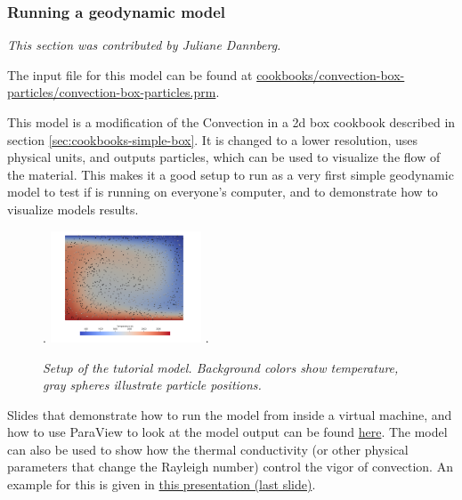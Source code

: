\subsubsection{Running a geodynamic model}
\label{sec:cookbooks-running-a-model}
\textit{This section was contributed by Juliane Dannberg.}

The input file for this model can be found at \url{cookbooks/convection-box-particles/convection-box-particles.prm}.

This model is a modification of the Convection in a 2d box cookbook described in section \ref{sec:cookbooks-simple-box}. 
It is changed to a lower resolution, uses physical units, and outputs particles, which can be used to visualize the flow 
of the material. 
This makes it a good setup to run as a very first simple geodynamic model to test if \aspect{} is running on everyone's
computer, and to demonstrate how to visualize models results. 

\begin{figure}[h]
\phantom.
\hfill
\includegraphics[width=0.4\textwidth]{cookbooks/convection-box-particles/doc/convection-box.png}
\hfill
\phantom.
\caption{\it Setup of the tutorial model. Background colors show temperature, gray spheres illustrate particle positions.}
\label{fig:convection-box-iterations}
\end{figure}

Slides that demonstrate how to run the model from inside a virtual machine, and how to use ParaView to look at the model
output can be found \href{https://www.dropbox.com/s/dmlcf4tx62ts6d1/02_geophysics_tutorial_01_08.pdf?dl=0}{here}. 
The model can also be used to show how the thermal conductivity (or other physical parameters that change the Rayleigh
number) control the vigor of convection. An example for this is given in \href{https://www.dropbox.com/s/nqkxe54poe1op7d/03_geophysics_lecture_01_10.pdf?dl=0}{this presentation (last slide)}.



